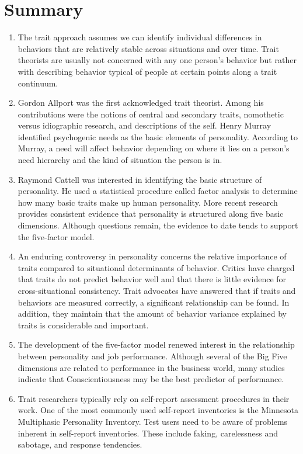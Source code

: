 \section{Summary}

\begin{enumerate}
    \item The trait approach assumes we can identify individual differences in behaviors that are relatively stable across situations and over time. Trait theorists are usually not concerned with any one person’s behavior but rather with describing behavior typical of people at certain points along a trait continuum.
    \item Gordon Allport was the first acknowledged trait theorist. Among his contributions were the notions of central and secondary traits, nomothetic versus idiographic research, and descriptions of the self. Henry Murray identified psychogenic needs as the basic elements of personality. According to Murray, a need will affect behavior depending on where it lies on a person’s need hierarchy and the kind of situation the person is in.
    \item Raymond Cattell was interested in identifying the basic structure of personality. He used a statistical procedure called factor analysis to determine how many basic traits make up human personality. More recent research provides consistent evidence that personality is structured along five basic dimensions. Although questions remain, the evidence to date tends to support the five-factor model.
    \item An enduring controversy in personality concerns the relative importance of traits compared to situational determinants of behavior. Critics have charged that traits do not predict behavior well and that there is little evidence for cross-situational consistency. Trait advocates have answered that if traits and behaviors are measured correctly, a significant relationship can be found. In addition, they maintain that the amount of behavior variance explained by traits is considerable and important.
    \item The development of the five-factor model renewed interest in the relationship between personality and job performance. Although several of the Big Five dimensions are related to performance in the business world, many studies indicate that Conscientiousness may be the best predictor of performance.
    \item Trait researchers typically rely on self-report assessment procedures in their work. One of the most commonly used self-report inventories is the Minnesota Multiphasic Personality Inventory. Test users need to be aware of problems inherent in self-report inventories. These include faking, carelessness and sabotage, and response tendencies.
\end{enumerate}
